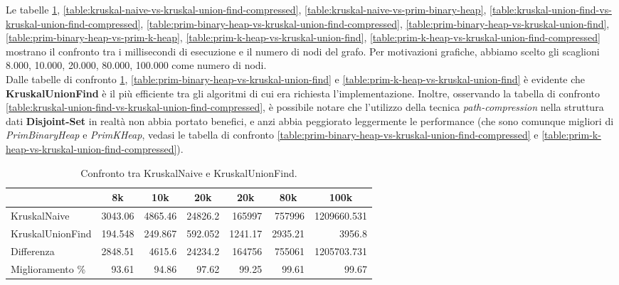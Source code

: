 \noindent Le tabelle \ref{table:kruskal-naive-vs-kruskal-union-find}, \ref{table:kruskal-naive-vs-kruskal-union-find-compressed}, \ref{table:kruskal-naive-vs-prim-binary-heap}, \ref{table:kruskal-union-find-vs-kruskal-union-find-compressed}, \ref{table:prim-binary-heap-vs-kruskal-union-find-compressed}, \ref{table:prim-binary-heap-vs-kruskal-union-find}, \ref{table:prim-binary-heap-vs-prim-k-heap}, \ref{table:prim-k-heap-vs-kruskal-union-find}, \ref{table:prim-k-heap-vs-kruskal-union-find-compressed} mostrano il confronto tra i millisecondi di esecuzione e il numero di nodi del grafo. Per motivazioni grafiche, abbiamo scelto gli scaglioni 8.000, 10.000, 20.000, 80.000, 100.000 come numero di nodi. \\

\noindent Dalle tabelle di confronto \ref{table:kruskal-naive-vs-kruskal-union-find}, \ref{table:prim-binary-heap-vs-kruskal-union-find} e \ref{table:prim-k-heap-vs-kruskal-union-find} è evidente che \textbf{KruskalUnionFind} è il più efficiente tra gli algoritmi di cui era richiesta l'implementazione. Inoltre, osservando la tabella di confronto \ref{table:kruskal-union-find-vs-kruskal-union-find-compressed}, è possibile notare che l'utilizzo della tecnica \textit{path-compression} nella struttura dati \textbf{Disjoint-Set} in realtà non abbia portato benefici, e anzi abbia peggiorato leggermente le performance (che sono comunque migliori di \textit{PrimBinaryHeap} e \textit{PrimKHeap}, vedasi le tabella di confronto \ref{table:prim-binary-heap-vs-kruskal-union-find-compressed} e \ref{table:prim-k-heap-vs-kruskal-union-find-compressed}). \\

\begin{table}[H]
\centering
    \begin{tabular}{|l|rrrrrr|}
    \hline
    &  \multicolumn{1}{c}{8k} & \multicolumn{1}{c}{10k} & \multicolumn{1}{c}{20k} & \multicolumn{1}{c}{20k} & \multicolumn{1}{c}{80k} &           \multicolumn{1}{c|}{100k} \\
    \hline
     KruskalNaive     & 3043.06  & 4865.46  & 24826.2   & 165997    & 757996    &    1209660.531 \\
     KruskalUnionFind &  194.548 &  249.867 &   592.052 &   1241.17 &   2935.21 & 3956.8         \\ \hline
     Differenza       & 2848.51  & 4615.6   & 24234.2   & 164756    & 755061    &    1205703.731  \\
     Miglioramento \%  &   93.61  &   94.86  &    97.62  &     99.25 &     99.61 &   99.67           \\
    \hline
    \end{tabular}
    \caption{Confronto tra KruskalNaive e KruskalUnionFind.}
    \label{table:kruskal-naive-vs-kruskal-union-find}
\end{table}

